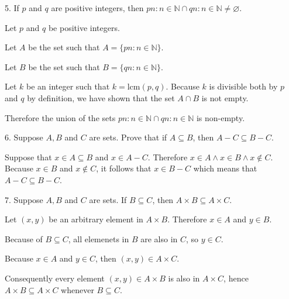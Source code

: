 \documentclass{idrisMemo}
\newcommand{\set}[1]{\{#1\}}
\begin{document}
\begin{prooflist}{5. If $p$ and $q$ are positive integers, then ${p n: n \in \mathbb{N}} \cap{q n: n \in \mathbb{N}} \neq \varnothing$.}
\item Let $p$ and $q$ be positive integers.
\item Let $A$ be the set such that $A=\set{pn:n\in\mathbb{N}}$.
\item Let $B$ be the set such that $B=\set{qn:n\in\mathbb{N}}$.
\item Let $k$ be an integer such that $k=\text{lcm}(p, q)$. Because $k$ is
    divisible both by $p$ and $q$ by definition, we have shown that the set $A
    \cap B$ is not empty.
\item Therefore the union of the sets
${p n: n \in \mathbb{N}} \cap{q n: n \in \mathbb{N}}$ is non-empty.
\end{prooflist}

\begin{prooflist}{6. Suppose $A, B$ and $C$ are sets. Prove that if $A \subseteq B$, then $A-C \subseteq B-C$.}
\item
Suppose that $x\in A\subseteq B$ and $x\in A-C$. Therefore $x\in A\land x\in B
\land x \notin C$. Because $x\in B$ and $x\notin C$, it follows that $x\in B-C$
which means that $A-C\subseteq B-C$.
\end{prooflist}

\begin{prooflist}{7. Suppose $A, B$ and $C$ are sets. If $B \subseteq C$, then $A \times B \subseteq A \times C$.}
\item Let $(x, y)$ be an arbitrary element in $A\times B$. Therefore $x\in A$
    and $y\in B$.
\item Because of $B\subseteq C$, all elemenets in $B$ are also in $C$, so $y\in C$.
\item Because $x\in A$ and $y\in C$, then $(x, y) \in A \times C$.
\item Consequently every element $(x, y) \in A\times B$ is also in $A\times C$,
    hence $A \times B \subseteq A \times C$ whenever $B\subseteq C$.
\end{prooflist}
\end{document}

